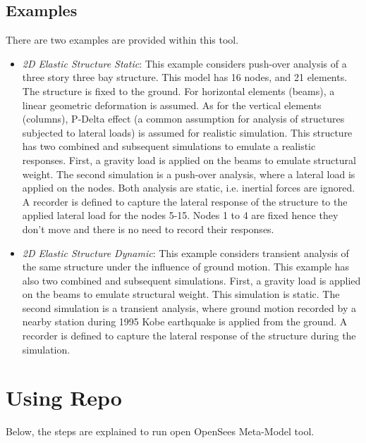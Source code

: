 \documentclass[letterpaper]{article}
\begin{document}
	\subsection*{Examples}
	There are two examples are provided within this tool.
	\begin{itemize}
		\item \textit{2D Elastic Structure Static}: This example considers push-over analysis of a three story three bay structure. This model has 16 nodes, and 21 elements. The structure is fixed to the ground. For  horizontal elements (beams), a linear geometric deformation is assumed. As for the vertical elements (columns), P-Delta effect (a common assumption for analysis of structures subjected to lateral loads) is assumed for realistic simulation.
		This structure has two combined and subsequent simulations to emulate a realistic responses. First, a gravity load is applied on the beams to emulate structural weight. The second simulation is a push-over analysis, where a lateral load is applied on the nodes. Both analysis are static, i.e. inertial forces are ignored.
		A recorder is defined to capture the lateral response of the structure to the applied lateral load for the nodes 5-15. Nodes 1 to 4 are fixed hence they don't move and there is no need to record their responses.
		\item \textit{2D Elastic Structure Dynamic}: This example considers transient analysis of the same structure under the influence of ground motion. 
		This example has also two combined and subsequent simulations. First, a gravity load is applied on the beams to emulate structural weight. This simulation is static. The second simulation is a transient analysis, where ground motion recorded by a nearby station during 1995 Kobe earthquake is applied from the ground.
		A recorder is defined to capture the lateral response of the structure during the simulation.
	\end{itemize}
	
	\section*{Using Repo}
	Below, the steps are explained to run open OpenSees Meta-Model tool.
	
\end{document}
